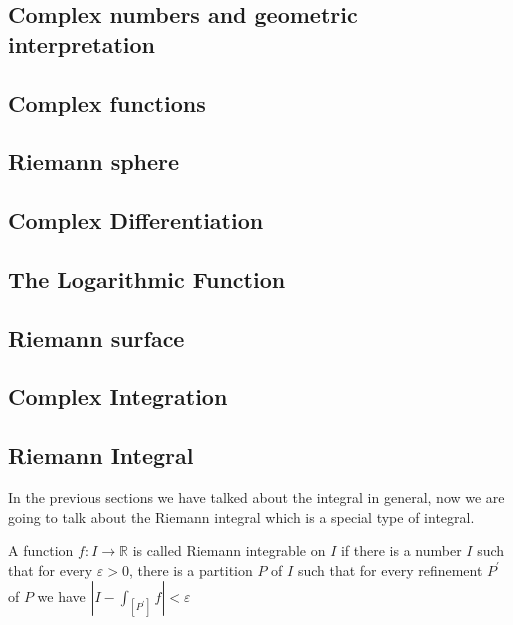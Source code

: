 \documentclass{article}
\newcommand{\R}{\mathbb{R}}
\begin{document}
\subsection{Complex numbers and geometric interpretation}
\subsection{Complex functions}
\subsection{Riemann sphere}
\subsection{Complex Differentiation}
\subsection{The Logarithmic Function}
\subsection{Riemann surface}
\subsection{Complex Integration}























\subsection{Riemann Integral}
In the previous sections we have talked about the integral in general, now we are going to talk about the Riemann integral which is a special type of integral. 
\begin{definition}
A function $f:I\to \R$ is called Riemann integrable on $I$ if there is a number $I$ such that for every $\varepsilon >0$,
there is a partition $P$ of $I$ such that for every refinement $P^{'}$ of $P$ we have $|I-\int_{[P^{'}]}f|<\varepsilon$ 

\end{definition}
\end{document}
